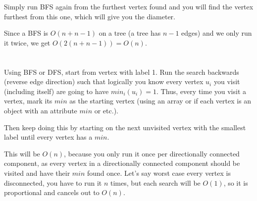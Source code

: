 \documentclass[11pt,letterpaper]{article}
\begin{document}
	Simply run BFS again from the furthest vertex found and you will find the vertex furthest from this one, which will give you the diameter.
	
	Since a BFS is $O(n+n-1)$ on a tree (a tree has $n-1$ edges) and we only run it twice, we get $O(2(n+n-1))=O(n)$.
	
	\section{}
	Using BFS or DFS, start from vertex with label 1. Run the search backwards (reverse edge direction) such that logically you know every vertex $u_i$ you visit (including itself) are going to have $min_i(u_i)=1$. Thus, every time you visit a vertex, mark its $min$ as the starting vertex (using an array or if each vertex is an object with an attribute $min$ or etc.).
	
	Then keep doing this by starting on the next unvisited vertex with the smallest label until every vertex has a $min$.
	
	This will be $O(n)$, because you only run it once per directionally connected component, as every vertex in a directionally connected component should be visited and have their $min$ found once. Let's say worst case every vertex is disconnected, you have to run it $n$ times, but each search will be $O(1)$, so it is proportional and cancels out to $O(n)$.
	
\end{document}
